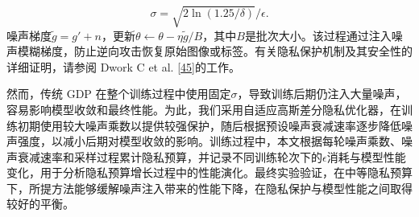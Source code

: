 \begin{equation}\label{eq:noise-multiplier}
\sigma = \sqrt{2\ln(1.25/\delta)}/\epsilon.
\end{equation}
噪声梯度\(\widetilde{g} = g' + n\)，更新\(\theta \leftarrow \theta - \eta\widetilde{g}/B\)，其中\(B\)是批次大小。该过程通过注入噪声模糊梯度，防止逆向攻击恢复原始图像或标签。有关隐私保护机制及其安全性的详细证明，请参阅 Dwork C et al. \hyperref[_Ref214903493]{{[}45{]}}的工作。

然而，传统 GDP 在整个训练过程中使用固定\(\sigma\)，导致训练后期仍注入大量噪声，容易影响模型收敛和最终性能。为此，我们采用自适应高斯差分隐私优化器，在训练初期使用较大噪声乘数以提供较强保护，随后根据预设噪声衰减速率逐步降低噪声强度，以减小后期对模型收敛的影响。训练过程中，本文根据每轮噪声乘数、噪声衰减速率和采样过程累计隐私预算，并记录不同训练轮次下的\(\epsilon\)消耗与模型性能变化，用于分析隐私预算增长过程中的性能演化。最终实验验证，在中等隐私预算下，所提方法能够缓解噪声注入带来的性能下降，在隐私保护与模型性能之间取得较好的平衡。
